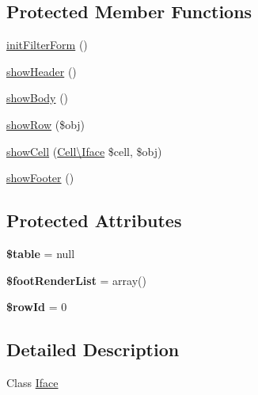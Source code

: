 \subsection*{Protected Member Functions}
\begin{DoxyCompactItemize}
\item 
\hyperlink{classTk_1_1Table_1_1Renderer_1_1Iface_af867242ecfb4b072b1477e9d267842ce}{init\+Filter\+Form} ()
\item 
\hyperlink{classTk_1_1Table_1_1Renderer_1_1Iface_a804b5db07a8704fbde1a354c0f41cd19}{show\+Header} ()
\item 
\hyperlink{classTk_1_1Table_1_1Renderer_1_1Iface_a38112665a39f4632e874da31c6406c3a}{show\+Body} ()
\item 
\hyperlink{classTk_1_1Table_1_1Renderer_1_1Iface_ae7848d09be2e5531784e607a9e0044bc}{show\+Row} (\$obj)
\item 
\hyperlink{classTk_1_1Table_1_1Renderer_1_1Iface_a3fd613e8182bd0cbc6f6deb6f6de9055}{show\+Cell} (\hyperlink{classTk_1_1Table_1_1Cell_1_1Iface}{Cell\textbackslash{}\+Iface} \$cell, \$obj)
\item 
\hyperlink{classTk_1_1Table_1_1Renderer_1_1Iface_a91dfeafc861134a1b4f8f40d637b3a87}{show\+Footer} ()
\end{DoxyCompactItemize}
\subsection*{Protected Attributes}
\begin{DoxyCompactItemize}
\item 
\hypertarget{classTk_1_1Table_1_1Renderer_1_1Iface_a9b9673e6458d2ce575f3522c9e942f2f}{{\bfseries \$table} = null}\label{classTk_1_1Table_1_1Renderer_1_1Iface_a9b9673e6458d2ce575f3522c9e942f2f}

\item 
\hypertarget{classTk_1_1Table_1_1Renderer_1_1Iface_a2ac2a8f817b4849b0b5d787cb8a83f0f}{{\bfseries \$foot\+Render\+List} = array()}\label{classTk_1_1Table_1_1Renderer_1_1Iface_a2ac2a8f817b4849b0b5d787cb8a83f0f}

\item 
\hypertarget{classTk_1_1Table_1_1Renderer_1_1Iface_a1a8c7c7b124e173cb99f1b2ce430d933}{{\bfseries \$row\+Id} = 0}\label{classTk_1_1Table_1_1Renderer_1_1Iface_a1a8c7c7b124e173cb99f1b2ce430d933}

\end{DoxyCompactItemize}


\subsection{Detailed Description}
Class \hyperlink{classTk_1_1Table_1_1Renderer_1_1Iface}{Iface}

